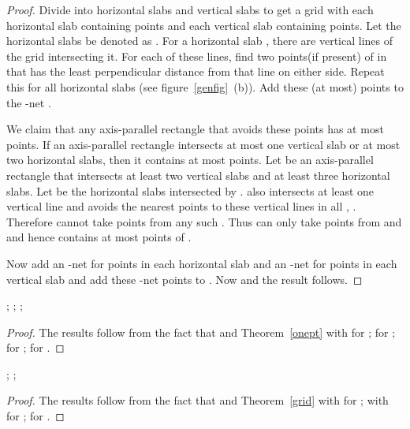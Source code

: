 \begin{proof}
Divide  into  horizontal slabs and  vertical slabs to get a grid with each horizontal slab containing  points and each vertical slab containing
 points. Let the horizontal slabs be denoted as . For a horizontal slab , there are  vertical lines of the grid intersecting it. For each of these lines, find two points(if present) of  in  that has the
least perpendicular distance from that line on either side. Repeat this for all horizontal slabs  (see figure~\ref{genfig}~(b)). Add these (at most)
 points  to the -net .

 We claim that any
axis-parallel rectangle that avoids these points has at most  points. If an axis-parallel rectangle intersects at most one vertical slab or at most two horizontal slabs, then it contains at most  points. Let
 be an axis-parallel rectangle that intersects at least two vertical slabs and at least three horizontal slabs. Let  be the horizontal slabs intersected by . 
 also intersects at least one 
vertical line and avoids the nearest points to these vertical lines in all , . Therefore  cannot take  points from any such . Thus  can only take points from  and  and hence contains at most  points of .  
\vspace{0.1in}


Now add an -net for points in each horizontal slab and an
-net for points in each vertical slab and add these -net points
to . Now  and the result follows.

\end{proof} 

\begin{lem}
; ;
; 
\end{lem}
\begin{proof}
The results follow from the fact that  and Theorem~\ref{onept} with  for
;  for
;  for ;  for
.

\end{proof}
\begin{lem}
; ;

\end{lem}
\begin{proof}
The results follow from the fact that  and Theorem~\ref{grid} with  for
; with  for ;
 for .

\end{proof}
